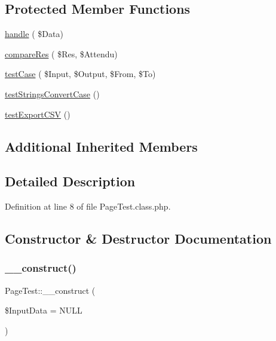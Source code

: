 \subsection*{Protected Member Functions}
\begin{DoxyCompactItemize}
\item 
\hyperlink{class_page_test_a8773e93e42863099063f459a81da9407}{handle} ( \$Data)
\item 
\hyperlink{class_page_test_a4d3c2315c1baf52ee8e5f6eec04f3818}{compare\+Res} ( \$Res, \$Attendu)
\item 
\hyperlink{class_page_test_a9f3eb21c358b30bd87bbb383a953bfea}{test\+Case} ( \$Input, \$Output, \$From, \$To)
\item 
\hyperlink{class_page_test_aeea79500b4f16c79da7bc4ce360268fb}{test\+Strings\+Convert\+Case} ()
\item 
\hyperlink{class_page_test_a845eee2f9f69bfd55f596d2ae2614b04}{test\+Export\+C\+SV} ()
\end{DoxyCompactItemize}
\subsection*{Additional Inherited Members}


\subsection{Detailed Description}


Definition at line 8 of file Page\+Test.\+class.\+php.



\subsection{Constructor \& Destructor Documentation}
\mbox{\label{class_page_test_a808f30b68701ec7ae61f5b8cde69915b}} 
\subsubsection{\texorpdfstring{\+\_\+\+\_\+construct()}{\_\_construct()}}
{\footnotesize\ttfamily Page\+Test\+::\+\_\+\+\_\+construct (\begin{DoxyParamCaption}\item[{}]{\$\+Input\+Data = {\ttfamily NULL} }\end{DoxyParamCaption})}

